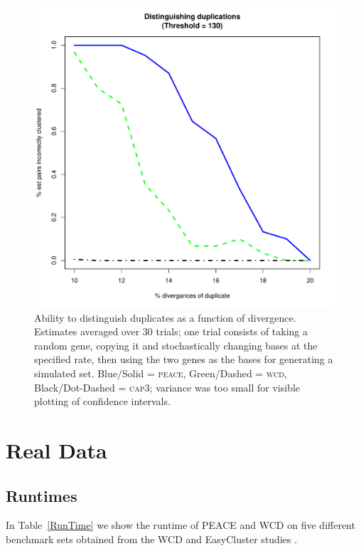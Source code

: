 \documentclass[a4paper,12pt]{article}
\newcommand{\peace} {{\small PEACE}}
\newcommand{\wcd} {{\small WCD}}
\begin{document}
\begin{appendix}
\begin{figure}[tbp]
\centerline{
\includegraphics[scale=0.35]{pics.d/duplicates_130.pdf}
}
\caption{Ability to distinguish duplicates as a function of
  divergence.  Estimates averaged over 30 trials; one trial consists
  of taking a random gene, copying it and stochastically changing bases
  at the specified rate, then using the two genes as the bases for
  generating a simulated set. Blue/Solid = \textsc{peace}, Green/Dashed = \textsc{wcd}, Black/Dot-Dashed = \textsc{cap3};
  variance was too small for visible plotting of
  confidence intervals.}\label{dups130}
\end{figure}


\section{Real Data}

\subsection{Runtimes}

In Table~\ref{RunTime} we show the runtime of \peace\/ and \wcd\/ on
five different benchmark sets obtained from the WCD and EasyCluster
studies \cite{Hazelhurst08a,Picardi09}. 


\end{appendix}
\end{document}
